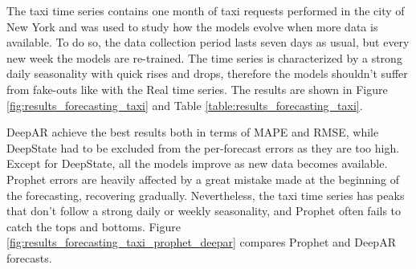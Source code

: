 \documentclass[a4paper, 12pt]{article} %
\begin{document}
	The taxi time series contains one month of taxi requests performed in the city of New York \cite{TaxiDataset} and was used to study how the models evolve when more data is available. To do so, the data collection period lasts seven days as usual, but every new week the models are re-trained. The time series is characterized by a strong daily seasonality with quick rises and drops, therefore the models shouldn't suffer from fake-outs like with the Real time series. The results are shown in Figure \ref{fig:results_forecasting_taxi} and Table \ref{table:results_forecasting_taxi}. 
	
	DeepAR achieve the best results both in terms of MAPE and RMSE, while DeepState had to be excluded from the per-forecast errors as they are too high. Except for DeepState, all the models improve as new data becomes available. Prophet errors are heavily affected by a great mistake made at the beginning of the forecasting, recovering gradually. Nevertheless, the taxi time series has peaks that don't follow a strong daily or weekly seasonality, and Prophet often fails to catch the tops and bottoms. Figure \ref{fig:results_forecasting_taxi_prophet_deepar} compares Prophet and DeepAR forecasts.
	
\end{document}
